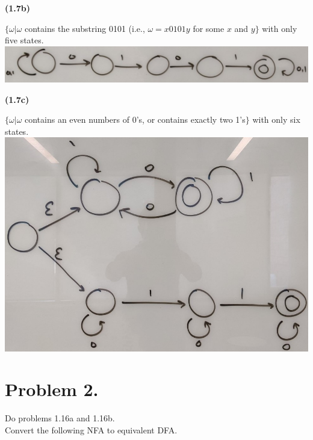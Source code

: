 \documentclass[11pt]{article}
\begin{document}
\textbf{(1.7b)}
    \begin{center}
        $\{ \omega | \omega$ contains the substring 0101 (i.e., $\omega = x0101y$ for some $x$ and $y\}$ with only five states.\\
        \bigbreak
        \includegraphics[width = .9\linewidth]{images/homework02/answer1.7b.jpg}\\
    \end{center}
\bigbreak
\textbf{(1.7c)}
    \begin{center}
        $\{\omega | \omega$ contains an even numbers of 0's, or contains exactly two 1's$\}$ with only six states.\\
        \bigbreak
        \includegraphics[width = 0.8\linewidth]{images/homework02/answer1.7c.jpg}\\
    \end{center}

\newpage





\section*{Problem 2.}
Do problems 1.16a and 1.16b.\\
Convert the following NFA to equivalent DFA.\\
\end{document}
